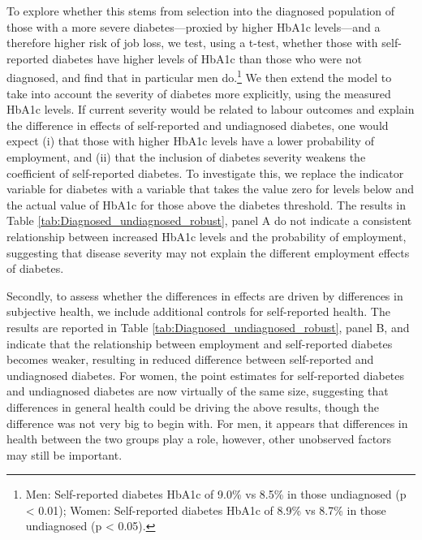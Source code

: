 \documentclass[12pt,english]{article}
\begin{document}
To explore whether this stems from selection into the diagnosed population of those with a more severe diabetes---proxied by higher \ac{HbA1c} levels---and a therefore higher risk of job loss,  we test, using a t-test, whether those with self-reported diabetes have higher levels of \ac{HbA1c} than those who were not diagnosed, and find that in particular men do.\footnote{Men: Self-reported diabetes \ac{HbA1c} of 9.0\% vs 8.5\% in those undiagnosed (p < 0.01); Women: Self-reported diabetes \ac{HbA1c} of 8.9\% vs 8.7\% in those undiagnosed (p < 0.05).} We then extend the model to take into account the severity of diabetes more explicitly, using the measured \ac{HbA1c} levels. If current severity would be related to labour outcomes and explain the difference in effects of self-reported and undiagnosed diabetes, one would expect (i) that those with higher \ac{HbA1c} levels have a lower probability of employment, and (ii) that the inclusion of diabetes severity weakens the coefficient of self-reported diabetes.  To investigate this, we replace the indicator variable for diabetes with a variable that takes the value zero for levels below and the actual value of \ac{HbA1c} for those above the diabetes threshold. The results in Table \ref{tab:Diagnosed_undiagnosed_robust}, panel A do not indicate a consistent relationship between increased \ac{HbA1c} levels and the probability of employment, suggesting that disease severity may not explain the different employment effects of diabetes. 

Secondly, to assess whether the differences in effects are driven by differences in subjective health, we include additional controls for self-reported health. The results are reported in Table \ref{tab:Diagnosed_undiagnosed_robust}, panel B, and indicate that the relationship between employment and self-reported diabetes becomes weaker, resulting in reduced difference between self-reported and undiagnosed diabetes. For women, the point estimates for self-reported diabetes and undiagnosed diabetes are now virtually of the same size, suggesting that differences in general health could be driving the above results, though the difference was not very big to begin with. For men, it appears that differences in health between the two groups play a role, however, other unobserved factors may still be important.
\end{document}
